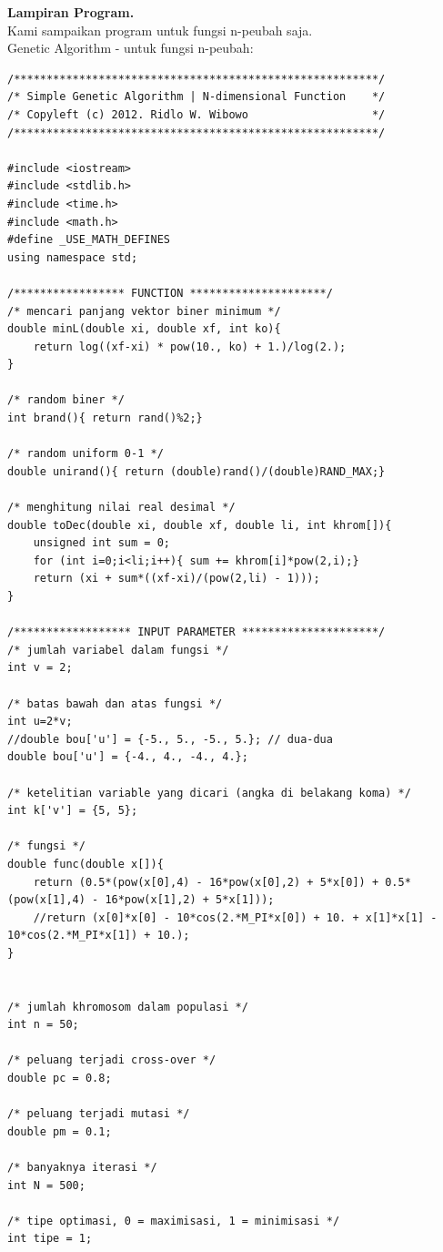 \documentclass[paper=a4, fontsize=11pt]{scrartcl}
\numberwithin{equation}{section} %
\numberwithin{figure}{section} %
\numberwithin{table}{section} %
\begin{document}
\newpage
\large \textbf{Lampiran Program.}\\
Kami sampaikan program untuk fungsi n-peubah saja.\\
\large Genetic Algorithm - untuk fungsi n-peubah:
\lstset{frameround=fttt}
\begin{lstlisting}
/********************************************************/
/* Simple Genetic Algorithm | N-dimensional Function    */
/* Copyleft (c) 2012. Ridlo W. Wibowo                   */
/********************************************************/

#include <iostream>
#include <stdlib.h>
#include <time.h>
#include <math.h>
#define _USE_MATH_DEFINES
using namespace std;

/***************** FUNCTION *********************/
/* mencari panjang vektor biner minimum */
double minL(double xi, double xf, int ko){
    return log((xf-xi) * pow(10., ko) + 1.)/log(2.);
}

/* random biner */
int brand(){ return rand()%2;}

/* random uniform 0-1 */
double unirand(){ return (double)rand()/(double)RAND_MAX;}

/* menghitung nilai real desimal */
double toDec(double xi, double xf, double li, int khrom[]){
    unsigned int sum = 0;
    for (int i=0;i<li;i++){ sum += khrom[i]*pow(2,i);}
    return (xi + sum*((xf-xi)/(pow(2,li) - 1)));
}

/****************** INPUT PARAMETER *********************/
/* jumlah variabel dalam fungsi */
int v = 2;

/* batas bawah dan atas fungsi */
int u=2*v;
//double bou['u'] = {-5., 5., -5., 5.}; // dua-dua
double bou['u'] = {-4., 4., -4., 4.}; 

/* ketelitian variable yang dicari (angka di belakang koma) */
int k['v'] = {5, 5}; 

/* fungsi */
double func(double x[]){
    return (0.5*(pow(x[0],4) - 16*pow(x[0],2) + 5*x[0]) + 0.5*(pow(x[1],4) - 16*pow(x[1],2) + 5*x[1]));
    //return (x[0]*x[0] - 10*cos(2.*M_PI*x[0]) + 10. + x[1]*x[1] - 10*cos(2.*M_PI*x[1]) + 10.);
}


/* jumlah khromosom dalam populasi */
int n = 50;

/* peluang terjadi cross-over */
double pc = 0.8;

/* peluang terjadi mutasi */
double pm = 0.1;

/* banyaknya iterasi */
int N = 500;

/* tipe optimasi, 0 = maximisasi, 1 = minimisasi */
int tipe = 1;




\end{lstlisting}
\end{document}
